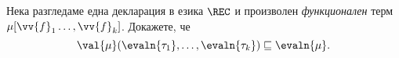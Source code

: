 \begin{problem}
  Нека разгледаме една декларация  в езика $\REC$ и произволен {\em функционален} терм $\mu[\vv{f}_1\dots,\vv{f}_k]$.
  Докажете, че
  \[\val{\mu}(\evaln{\tau_1},\dots,\evaln{\tau_k}) \sqsubseteq \evaln{\mu}.\]
\end{problem}
    

